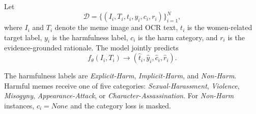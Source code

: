 \documentclass[11pt]{article}
\begin{document}
Let
\begin{equation}
\mathcal{D}
=
\{(I_i,T_i,t_i,y_i,c_i,r_i)\}_{i=1}^{N},
\end{equation}
where $I_i$ and $T_i$ denote the meme image and OCR text,
$t_i$ is the women-related target label, $y_i$ is the harmfulness
label, $c_i$ is the harm category, and $r_i$ is the
evidence-grounded rationale. The model jointly predicts
\begin{equation}
f_{\theta}(I_i,T_i)
\rightarrow
(\hat{t}_i,\hat{y}_i,\hat{c}_i,\hat{r}_i).
\end{equation}

The harmfulness labels are \textit{Explicit-Harm},
\textit{Implicit-Harm}, and \textit{Non-Harm}. Harmful memes receive
one of five categories: \textit{Sexual-Harassment},
\textit{Violence}, \textit{Misogyny}, \textit{Appearance-Attack}, or
\textit{Character-Assassination}. For \textit{Non-Harm} instances,
$c_i=\textit{None}$ and the category loss is masked.

\end{document}
